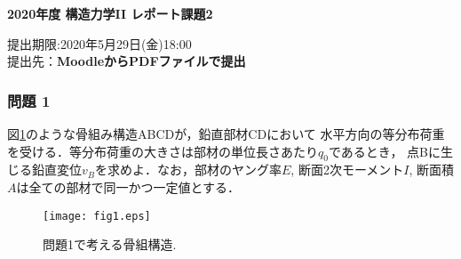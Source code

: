 \documentclass[10pt,a4j]{jarticle}
\newlength{\minitwocolumn}
\begin{document}
\newcommand{\fat}[1]{\mbox{\boldmath $#1$}}
\newcommand{\D}{\partial}
\newcommand{\w}{\omega}
\newcommand{\ga}{\alpha}
\newcommand{\gb}{\beta}
\newcommand{\gx}{\xi}
\newcommand{\gz}{\zeta}
\newcommand{\vhat}[1]{\hat{\fat{#1}}}
\newcommand{\spc}{\vspace{0.7\baselineskip}}
\newcommand{\halfspc}{\vspace{0.3\baselineskip}}

\newcommand{\twofig}[2]
 {
   \begin{figure}[h]
     \begin{minipage}[t]{\minitwocolumn}
         \begin{center}   #1
         \end{center}
     \end{minipage}
         \hspace{\columnsep}
     \begin{minipage}[t]{\minitwocolumn}
         \begin{center} #2
         \end{center}
     \end{minipage}
   \end{figure}
 }
\begin{center}
{\Large \bf 2020年度 構造力学II レポート課題2} \\
\end{center}
\begin{flushright}
	提出期限:2020年5月29日(金)18:00\\
	提出先：{\bf MoodleからPDFファイルで提出}
\end{flushright}
\vspace{10mm}
\subsubsection*{問題 1}
図\ref{fig:fig1}のような骨組み構造ABCDが，鉛直部材CDにおいて
水平方向の等分布荷重を受ける．等分布荷重の大きさは部材の単位長さあたり$q_0$であるとき，
点Bに生じる鉛直変位$v_B$を求めよ．なお，部材のヤング率$E$, 断面2次モーメント$I$, 
断面積$A$は全ての部材で同一かつ一定値とする．
\begin{figure}[h]
	\begin{center}
	\texttt{[image: fig1.eps]} 
	\end{center}
	\caption{問題1で考える骨組構造.} 
	\label{fig:fig1}
\end{figure}
\newpage
\end{document}
